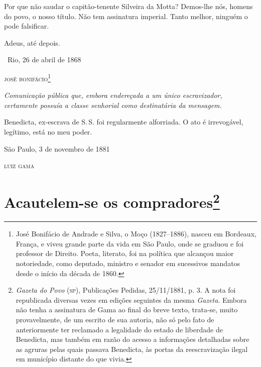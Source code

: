 Por que não saudar o capitão-tenente Silveira da Motta? Demos-lhe nós,
homens do povo, o nosso título. Não tem assinatura imperial. Tanto
melhor, ninguém o pode falsificar.

Adeus, até depois.\medskip

\hfill\ Rio, 26 de abril de 1868

\hfill\textsc{josé bonifácio}\footnote{José Bonifácio de Andrade e Silva, o Moço
  (1827--1886), nasceu em Bordeaux, França, e viveu grande parte da vida
  em São Paulo, onde se graduou e foi professor de Direito. Poeta,
  literato, foi na política que alcançou maior notoriedade, como
  deputado, ministro e senador em sucessivos mandatos desde o início da
  década de 1860.}


\begin{resumo}
\emph{Comunicação pública que, embora endereçada a um único
escravizador, certamente possuía a classe senhorial como destinatária da
mensagem.}
\end{resumo}

Benedicta, ex-escrava de S.\,S. foi regularmente alforriada. O ato é
irrevogável, legítimo, está no meu poder.

\medskip

\hfill São Paulo, 3 de novembro de 1881

\hfill\textsc{luiz gama}

\chapter{Acautelem-se os compradores\footnote{\emph{Gazeta do Povo} (\textsc{sp}), Publicações
  Pedidas, 25/11/1881, p. 3. A nota foi republicada diversas vezes em
  edições seguintes da mesma \emph{Gazeta}. Embora não tenha a
  assinatura de Gama ao final do breve texto, trata-se, muito
  provavelmente, de um escrito de sua autoria, não só pelo fato de
  anteriormente ter reclamado a legalidade do estado de liberdade de
  Benedicta, mas também em razão do acesso a informações detalhadas
  sobre as agruras pelas quais passava Benedicta, às portas da
  reescravização ilegal em município distante do que vivia.}}

